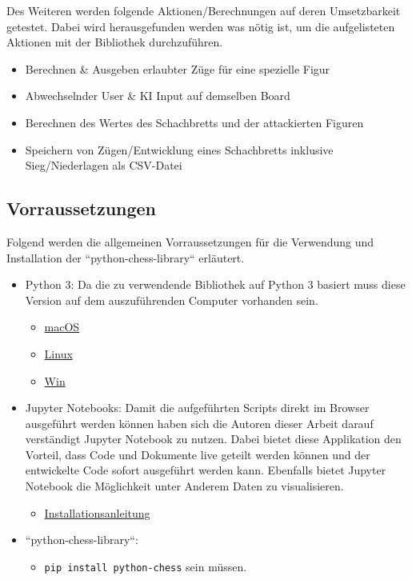 Des Weiteren werden folgende Aktionen/Berechnungen auf deren
Umsetzbarkeit getestet. Dabei wird herausgefunden werden was nötig ist,
um die aufgelisteten Aktionen mit der Bibliothek durchzuführen.

\begin{itemize}
\tightlist
\item
  Berechnen \& Ausgeben erlaubter Züge für eine spezielle Figur
\item
  Abwechselnder User \& KI Input auf demselben Board
\item
  Berechnen des Wertes des Schachbretts und der attackierten Figuren
\item
  Speichern von Zügen/Entwicklung eines Schachbretts inklusive
  Sieg/Niederlagen als CSV-Datei
\end{itemize}

\subsection{Vorraussetzungen}\label{vorraussetzungen}

Folgend werden die allgemeinen Vorraussetzungen für die Verwendung und
Installation der ``python-chess-library`` erläutert.

\begin{itemize}
\tightlist
\item
  Python 3: Da die zu verwendende Bibliothek auf Python 3 basiert muss
  diese Version auf dem auszuführenden Computer vorhanden sein.

  \begin{itemize}
  \tightlist
  \item
    \href{https://wsvincent.com/install-python3-mac/}{macOS}
  \item
    \href{https://docs.python-guide.org/starting/install3/linux/}{Linux}
  \item
    \href{https://realpython.com/installing-python/}{Win}
  \end{itemize}
\item
  Jupyter Notebooks: Damit die aufgeführten Scripts direkt im Browser
  ausgeführt werden können haben sich die Autoren dieser Arbeit darauf
  verständigt Jupyter Notebook zu nutzen. Dabei bietet diese Applikation
  den Vorteil, dass Code und Dokumente live geteilt werden können und
  der entwickelte Code sofort ausgeführt werden kann. Ebenfalls bietet
  Jupyter Notebook die Möglichkeit unter Anderem Daten zu visualisieren.

  \begin{itemize}
  \tightlist
  \item
    \href{https://jupyter.org/install}{Installationsanleitung}
  \end{itemize}
\item
  ``python-chess-library``:

  \begin{itemize}
  \tightlist
  \item
    \texttt{pip\ install\ python-chess}
    sein müssen.
  \end{itemize}
\end{itemize}

